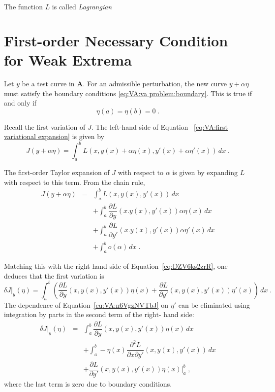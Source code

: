The function $L$ is called \emph{Lagrangian}

\section{First-order Necessary Condition for Weak Extrema}

Let $y$ be a test curve in $\mathbf{A}$. For an admissible perturbation,
the new curve $y+\alpha\eta$ must satisfy the boundary conditions 
\eqref{eq:VA:va problem:boundary}. This is true if and only if
\[\eta(a)=\eta(b)=0\;.\]

Recall the first variation of $J$. The left-hand side of Equation~
\eqref{eq:VA:first variational expansion} is given by
\begin{equation}\label{eq:DZV6ks2zrR}
J(y+\alpha\eta)=\int_a^bL(x, y(x)+\alpha\eta(x),y'(x)+\alpha\eta'(x))
\,dx\;.
\end{equation}

The first-order Taylor expansion of $J$ with respect to $\alpha$ is 
given by expanding $L$ with respect to this term. From the chain rule,
\begin{equation*}
	\begin{array}{rcl}
		J(y+\alpha\eta)&=&\int_a^b L(x, y(x), y'(x))\,dx\\
		&&+\int_a^b\dfrac{\partial L}{\partial y}(x. y(x),y'(x))\alpha\eta(x)\,dx\\
		&&+\int_a^b\dfrac{\partial L}{\partial y'}(x. y(x),y'(x))\alpha\eta'(x)\,dx\\
		&&+\int_a^b o(\alpha)\,dx\;.
	\end{array}
\end{equation*}

Matching this with the right-hand side of Equation~\eqref{eq:DZV6ks2zrR},
one deduces that the first variation is
\begin{equation}\label{eq:VA:n6VgzNVTbJ}
	\delta J|_y(\eta)=\int_a^b\left(\dfrac{\partial L}{\partial y}(x,
	y(x),y'(x))\eta(x) + \dfrac{\partial L}{\partial y'}(x,
	y(x),y'(x))\eta'(x)\right)\, dx\;.
\end{equation}
The dependence of Equation~\eqref{eq:VA:n6VgzNVTbJ} on $\eta'$ can be
eliminated using integration by parts in the second term of the right-
hand side:
\begin{equation}
	\begin{array}{rcl}
	\delta J|_y(\eta)&=&\int_a^b\dfrac{\partial L}{\partial y}(x,
	y(x),y'(x))\eta(x)\,dx\\
	&&+\int_a^b - \eta(x)\dfrac{\partial^2 L}{\partial x\partial y'}(x,
	y(x),y'(x))\, dx\\
	&&+\dfrac{\partial L}{\partial y'}(x, y(x), y'(x))\eta(x)|_a^b\;,
	\end{array}
\end{equation}
where the last term is zero due to boundary conditions.

